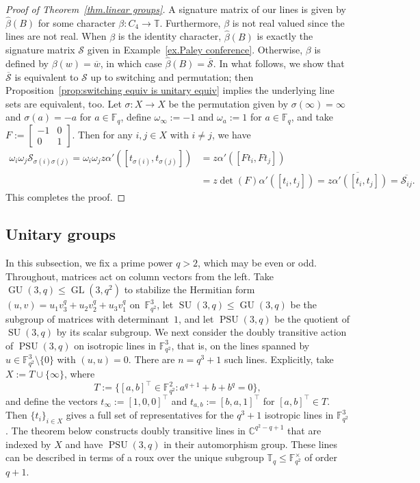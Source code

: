 \documentclass[11pt]{article}
\theoremstyle{definition}
\numberwithin{equation}{section}
\begin{document}
\begin{proof}[Proof of Theorem~\ref{thm.linear groups}]
A signature matrix of our lines is given by $\hat\beta(B)$ for some character $\beta\colon C_4\to\mathbb{T}$.
Furthermore, $\beta$ is not real valued since the lines are not real.
When $\beta$ is the identity character, $\hat\beta(B)$ is exactly the signature matrix $\mathcal{S}$ given in Example~\ref{ex.Paley conference}.
Otherwise, $\beta$ is defined by $\beta(w)=\overline{w}$, in which case $\hat\beta(B)=\overline{\mathcal{S}}$.
In what follows, we show that $\overline{\mathcal{S}}$ is equivalent to $\mathcal{S}$ up to switching and permutation; then Proposition~\ref{prop:switching equiv is unitary equiv} implies the underlying line sets are equivalent, too.
Let $\sigma\colon X\to X$ be the permutation given by $\sigma(\infty)=\infty$ and $\sigma(a)=-a$ for $a\in\mathbb{F}_q$, define $\omega_\infty:=-1$ and $\omega_a:=1$ for $a\in\mathbb{F}_q$, and take $F:=\left[\begin{array}{cc}-1&0\\0&1\end{array}\right]$.
Then for any $i,j\in X$ with $i\neq j$, we have
\begin{align*}
\omega_i\omega_j\mathcal{S}_{\sigma(i)\sigma(j)}
=\omega_i\omega_jz\alpha'([t_{\sigma(i)},t_{\sigma(j)}])
&=z\alpha'([Ft_{i},Ft_{j}]) \\
&=z\operatorname{det}(F)\alpha'([t_{i},t_{j}])
=\overline{z\alpha'([t_{i},t_{j}])}
=\overline{\mathcal{S}_{ij}}.
\end{align*}
This completes the proof.
\end{proof}




\subsection{Unitary groups}
\label{subsec:unitary}

In this subsection, we fix a prime power $q>2$, which may be even or odd.
Throughout, matrices act on column vectors from the left.
Take $\operatorname{GU}(3,q) \leq \operatorname{GL}(3,q^2)$ to stabilize the Hermitian form $(u,v) = u_1 v_3^q + u_2 v_2^q + u_3 v_1^q$ on~$\mathbb{F}_{q^2}^3$, let $\operatorname{SU}(3,q) \leq \operatorname{GU}(3,q)$ be the subgroup of matrices with determinant~$1$, and let $\operatorname{PSU}(3,q)$ be the quotient of $\operatorname{SU}(3,q)$ by its scalar subgroup.
We next consider the doubly transitive action of $\operatorname{PSU}(3,q)$ on isotropic lines in $\mathbb{F}_{q^2}^3$, that is, on the lines spanned by $u \in \mathbb{F}_{q^2}^3 \setminus \{0 \}$ with $(u,u) = 0$.
There are $n = q^3 + 1$ such lines.
Explicitly, take $X:=T\cup\{\infty\}$, where
\[
T:=\{[a,b]^\top\in\mathbb{F}_{q^2}^2:a^{q+1}+b+b^q=0\},
\]
and define the vectors $t_\infty:=[1,0,0]^\top$ and 
$t_{a,b}:=[b,a,1]^\top$ 
for $[a,b]^\top\in T$.
Then $\{t_i\}_{i\in X}$ gives a full set of representatives for the $q^3+1$ isotropic lines in $\mathbb{F}_{q^2}^3$.
The theorem below constructs doubly transitive lines in $\mathbb{C}^{q^2-q+1}$ that are indexed by $X$ and have $\operatorname{PSU}(3,q)$ in their automorphism group.
These lines can be described in terms of a roux over the unique subgroup $\mathbb{T}_q\leq\mathbb{F}_{q^2}^\times$ of order $q+1$.
\end{document}
